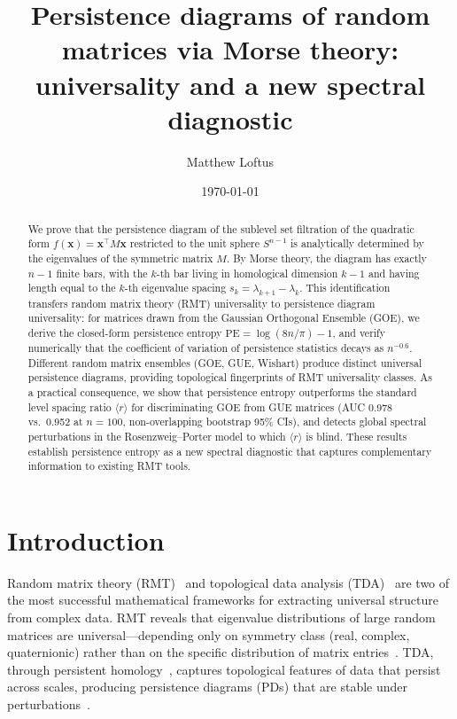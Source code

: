 \documentclass[aps,pre,twocolumn,superscriptaddress,showpacs]{revtex4-2}
\begin{document}
\title{Persistence diagrams of random matrices via Morse theory: universality and a new spectral diagnostic}

\author{Matthew Loftus}

\date{\today}

\begin{abstract}
We prove that the persistence diagram of the sublevel set filtration of the quadratic form $f(\mathbf{x}) = \mathbf{x}^\top M \mathbf{x}$ restricted to the unit sphere $S^{n-1}$ is analytically determined by the eigenvalues of the symmetric matrix $M$. By Morse theory, the diagram has exactly $n-1$ finite bars, with the $k$-th bar living in homological dimension $k-1$ and having length equal to the $k$-th eigenvalue spacing $s_k = \lambda_{k+1} - \lambda_k$. This identification transfers random matrix theory (RMT) universality to persistence diagram universality: for matrices drawn from the Gaussian Orthogonal Ensemble (GOE), we derive the closed-form persistence entropy $\mathrm{PE} = \log(8n/\pi) - 1$, and verify numerically that the coefficient of variation of persistence statistics decays as $n^{-0.6}$. Different random matrix ensembles (GOE, GUE, Wishart) produce distinct universal persistence diagrams, providing topological fingerprints of RMT universality classes. As a practical consequence, we show that persistence entropy outperforms the standard level spacing ratio $\langle r \rangle$ for discriminating GOE from GUE matrices (AUC 0.978 vs.\ 0.952 at $n = 100$, non-overlapping bootstrap 95\% CIs), and detects global spectral perturbations in the Rosenzweig--Porter model to which $\langle r \rangle$ is blind. These results establish persistence entropy as a new spectral diagnostic that captures complementary information to existing RMT tools.
\end{abstract}

\maketitle

\section{Introduction}
\label{sec:intro}

Random matrix theory (RMT)~\cite{mehta2004,anderson2010} and topological data analysis (TDA)~\cite{edelsbrunner2010,carlsson2009} are two of the most successful mathematical frameworks for extracting universal structure from complex data. RMT reveals that eigenvalue distributions of large random matrices are universal---depending only on symmetry class (real, complex, quaternionic) rather than on the specific distribution of matrix entries~\cite{wigner1955,tao2012}. TDA, through persistent homology~\cite{edelsbrunner2002,zomorodian2005}, captures topological features of data that persist across scales, producing persistence diagrams (PDs) that are stable under perturbations~\cite{cohen-steiner2007}.
\end{document}
